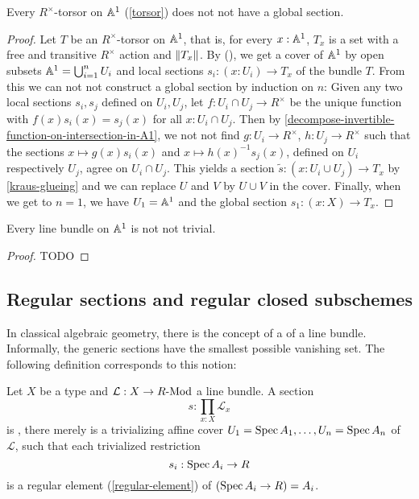 \begin{theorem}
  Every $R^\times$-torsor on $\mathbb{A}^1$ (\cref{torsor})
  does not not have a global section.
\end{theorem}

\begin{proof}
  Let $T$ be an $R^\times$-torsor on $\mathbb{A}^1$,
  that is,
  for every $x : \mathbb{A}^1$,
  $T_x$ is a set with a free and transitive $R^\times$ action
  and $\lVert T_x \rVert$.
  By (),
  we get a cover of $\mathbb{A}^1$ by open subsets $\mathbb{A}^1 = \bigcup_{i = 1}^n U_i$
  and local sections $s_i : (x : U_i) \to T_x$ of the bundle $T$.
  From this we can not not construct a global section by induction on $n$:
  Given any two local sections $s_i, s_j$ defined on $U_i, U_j$,
  let $f : U_i \cap U_j \to R^\times$ be the unique function with
  $f(x)s_i(x) = s_j(x)$ for all $x : U_i \cap U_j$.
  Then by \cref{decompose-invertible-function-on-intersection-in-A1},
  we not not find $g : U_i \to R^\times$, $h : U_j \to R^\times$
  such that the sections
  $x \mapsto g(x)s_i(x)$ and $x \mapsto {h(x)}^{-1}s_j(x)$,
  defined on $U_i$ respectively $U_j$,
  agree on $U_i \cap U_j$.
  This yields a section $\widetilde{s} : (x : U_i \cup U_j) \to T_x$
  by \cref{kraus-glueing}
  and we can replace $U$ and $V$ by $U \cup V$ in the cover.
  Finally, when we get to $n = 1$,
  we have $U_1 = \mathbb{A}^1$
  and the global section $s_1 : (x : X) \to T_x$.
\end{proof}

\begin{corollary}
  Every line bundle on $\mathbb{A}^1$ is not not trivial.
\end{corollary}

\begin{proof}
  TODO
\end{proof}

\subsection{Regular sections and regular closed subschemes}

In classical algebraic geometry,
there is the concept of a  of a line bundle.
Informally, the generic sections have the smallest possible vanishing set.
The following definition corresponds to this notion:

\begin{definition}%
  \label{regular-section}
  Let $X$ be a type and $\mathcal L:X\to R\text{-}\mathrm{Mod}$ a line bundle.
  A section
  \[ s:\prod_{x:X}\mathcal L_x \]
  is , there merely is a trivializing affine cover $U_1=\operatorname{Spec} A_1,\dots,U_n=\operatorname{Spec} A_n$
  of $\mathcal L$, such that each trivialized restriction
  \[ s_i:\operatorname{Spec} A_i\to R \]
  is a regular element (\cref{regular-element}) of $(\operatorname{Spec} A_i\to R) = A_i$.
\end{definition}

